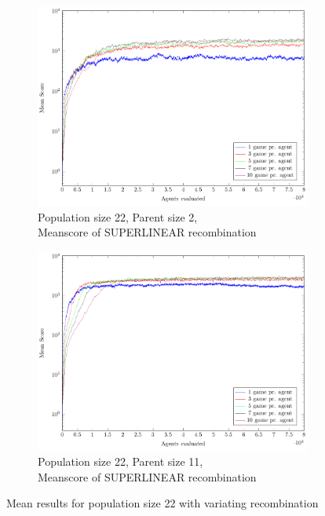 \begin{figure}
\begin{subfigure}[b]{0.45\textwidth}
    \end{subfigure}
    \begin{subfigure}[b]{0.45\textwidth}
    	\centering
    	\caption{Population size 22, Parent size 2, \\ Meanscore of SUPERLINEAR recombination}
        \includegraphics[width=\textwidth]{data/cma_population_offspring/22x_split/superlinear_l22_o2/mean/PlotFile.pdf}
    \end{subfigure}
    \begin{subfigure}[b]{0.45\textwidth}
    	\centering
    	\caption{Population size 22, Parent size 11, \\ Meanscore of SUPERLINEAR recombination}
        \includegraphics[width=\textwidth]{data/cma_population_offspring/22x_split/superlinear_l22_o11/mean/PlotFile.pdf}
    \end{subfigure}
    
    \caption{Mean results for population size 22 with variating recombination}
\end{figure}

